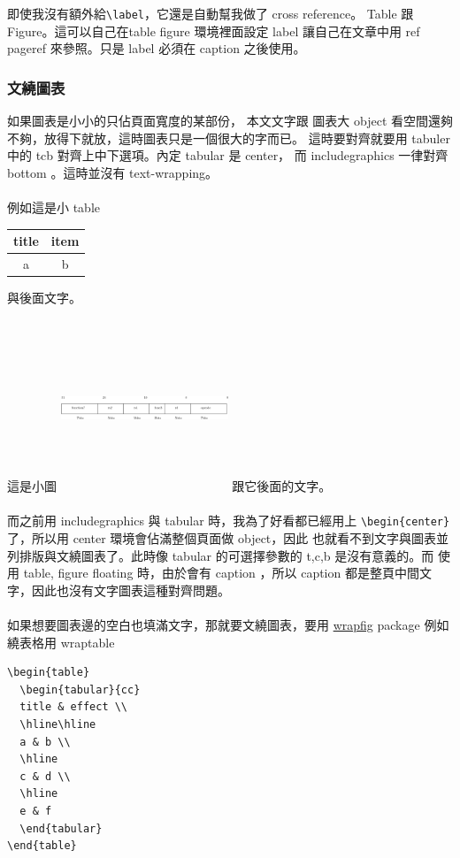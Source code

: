 即使我沒有額外給\verb=\label=，它還是自動幫我做了 cross reference。
Table 跟 Figure。這可以自己在table figure 環境裡面設定 label
讓自己在文章中用 ref pageref 來參照。只是 label 必須在 caption
之後使用。
\subsubsection{文繞圖表}
如果圖表是小小的只佔頁面寬度的某部份， 本文文字跟
圖表大 object 看空間還夠不夠，放得下就放，這時圖表只是一個很大的字而已。
這時要對齊就要用 tabuler 中的 tcb 對齊上中下選項。內定 tabular 是 center，
 而 includegraphics 一律對齊 bottom 。這時並沒有 text-wrapping。
\\\\
例如這是小 table 
\begin{tabular}{cc}
title & item \\
\hline\hline
a & b
\end{tabular}
與後面文字。
\\\\
這是小圖 \includegraphics[width=5cm,height=5cm]{images/riscv} 跟它後面的文字。
\\\\
而之前用 includegraphics 與 tabular 時，我為了好看都已經用上
 \verb=\begin{center}=了，所以用 center 環境會佔滿整個頁面做 object，因此
也就看不到文字與圖表並列排版與文繞圖表了。此時像 tabular 的可選擇參數的
 t,c,b 是沒有意義的。而 使用 table, figure floating 時，由於會有
 caption ，所以 caption 都是整頁中間文字，因此也沒有文字圖表這種對齊問題。
\\\\
如果想要圖表邊的空白也填滿文字，那就要文繞圖表，要用 
\href{https://mirror.math.princeton.edu/pub/CTAN/macros/latex/contrib/wrapfig/wrapfig-doc.pdf}{wrapfig} package
例如繞表格用 wraptable
\begin{verbatim}
\begin{table}
  \begin{tabular}{cc}
  title & effect \\
  \hline\hline
  a & b \\
  \hline
  c & d \\
  \hline
  e & f 
  \end{tabular}
\end{table}
\end{verbatim}

